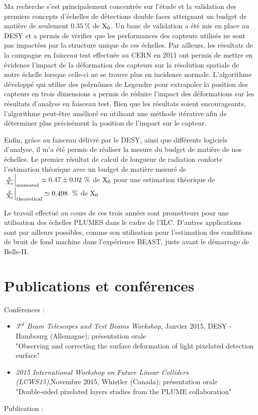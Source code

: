   Ma recherche s'est principalement concentrée sur l'étude et la validation des premiers concepts d'échelles de détections double faces atteignant un budget de matière de seulement $0.35~\%$ de $\rm{X_0}$.
  Un banc de validation a été mis en place au DESY et a permis de vérifier que les performances des capteurs utilisés ne sont pas impactées par la structure unique de ces échelles.
  Par ailleurs, les résultats de la campagne en faisceau test effectuée au CERN en 2011 ont permis de mettre en évidence l'impact de la déformation des capteurs sur la résolution spatiale de notre échelle lorsque celle-ci ne se trouve plus en incidence normale.
  L'algorithme développé qui utilise des polynômes de Legendre pour extrapoler la position des capteurs en trois dimensions a permis de réduire l'impact des déformations sur les résultats d'analyse en faisceau test.
  Bien que les résultats soient encourageants, l'algorithme peut-être amélioré en utilisant une méthode itérative afin de déterminer plus précisément la position de l'impact sur le capteur.
  
  Enfin, grâce au faisceau délivré par le DESY, ainsi que différents logiciels d'analyse, il m'a été permis de réaliser la mesure du budget de matière de nos échelles.
  Le premier résultat de calcul de longueur de radiation conforte l'estimation théorique avec un budget de matière mesuré de $\left. \frac{x}{X_0} \right|_{\rm{measured}} \simeq 0.47 \pm 0.02~\%$ de $\rm{X_0}$ pour une estimation théorique de $\left. \frac{x}{X_0}\right|_{\rm{theoretical}} \simeq 0.498~~\%$ de $\rm{X_0}$

  Le travail effectué au cours de ces trois années sont prometteurs pour une utilisation des échelles PLUMES dans le cadre de l'ILC.
  D'autres applications sont par ailleurs possibles, comme son utilisation pour l'estimation des conditions de bruit de fond machine dans l'expérience BEAST, juste avant le démarrage de Belle-II.

  \section*{Publications et conférences}

  Conférences :
  \begin{itemize}
    \item \textit{3$^{rd}$ Beam Telescopes and Test Beams Workshop}, Janvier 2015, DESY - Hambourg (Allemagne); présentation orale\\
    "Observing and correcting the surface deformation of light pixelated detection surface"
    \item \textit{2015 International Workshop on Future Linear Colliders (LCWS15)},Novembre 2015,  Whistler (Canada); présentation orale\\
    "Double-sided pixelated layers studies from the PLUME collaboration"
  \end{itemize}
  Publication :
  
